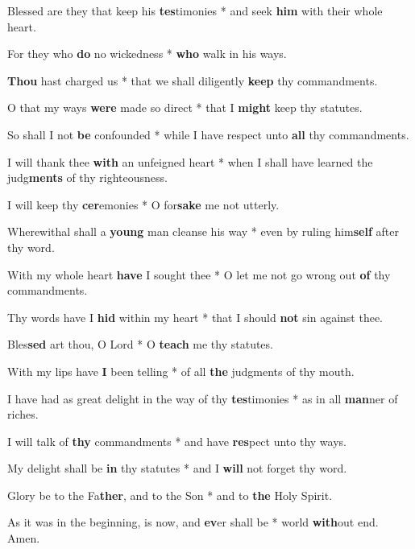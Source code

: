 \begin{multicols}{2}
	Blessed are they that keep his \textbf{tes}timonies * and seek \textbf{him} with their whole heart.
	
	For they who \textbf{do} no wickedness * \textbf{who} walk in his ways.
	
	\textbf{Thou} hast charged us * that we shall diligently \textbf{keep} thy commandments.
	
	O that my ways \textbf{were} made so direct * that I \textbf{might} keep thy statutes.
		
	So shall I not \textbf{be} confounded * while I have respect unto \textbf{all} thy commandments.
	
	I will thank thee \textbf{with} an unfeigned heart * when I shall have learned the judg\textbf{ments} of thy righteousness.
	
	I will keep thy \textbf{cer}emonies * O for\textbf{sake} me not utterly.
	
	Wherewithal shall a \textbf{young} man cleanse his way * even by ruling him\textbf{self} after thy word.
	
	With my whole heart \textbf{have} I sought thee * O let me not go wrong out \textbf{of} thy commandments.
	
	Thy words have I \textbf{hid} within my heart * that I should \textbf{not} sin against thee.
	
	Bles\textbf{sed} art thou, O Lord * O \textbf{teach} me thy statutes.
	
	With my lips have \textbf{I} been telling * of all \textbf{the} judgments of thy mouth.
	
	I have had as great delight in the way of thy \textbf{tes}timonies * as in all \textbf{man}ner of riches.
	
	I will talk of \textbf{thy} commandments * and have \textbf{res}pect unto thy ways.
	
	My delight shall be \textbf{in} thy statutes * and I \textbf{will} not forget thy word.
	
	Glory be to the Fa\textbf{ther}, and to the Son * and to \textbf{the} Holy Spirit.
	
	As it was in the beginning, is now, and \textbf{ev}er shall be * world \textbf{with}out end. Amen.
\end{multicols}